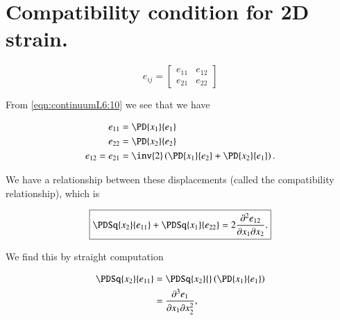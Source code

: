 % 
% 
% 
% 
% 
% 
% 
% 
% 
% 
% 
% 

\section{Compatibility condition for 2D strain.}

\begin{equation}\label{eqn:continuumL6:50}
e_{ij} = 
\begin{bmatrix}
e_{11} & e_{12} \\
e_{21} & e_{22}
\end{bmatrix}
\end{equation}

From \ref{eqn:continuumL6:10} we see that we have

\begin{align}\label{eqn:continuumL6:70}
e_{11} &= \PD{x_1}{e_1} \\
e_{22} &= \PD{x_2}{e_2} \\
e_{12} = e_{21} &= 
\inv{2} \left( 
\PD{x_1}{e_2}
+ \PD{x_2}{e_1} 
\right).
\end{align}

We have a relationship between these displacements (called the compatibility relationship), which is

\begin{equation}\label{eqn:continuumL6:110}
\boxed{
\PDSq{x_2}{e_{11}} +
\PDSq{x_1}{e_{22}} = 
2
\frac{\partial^2 e_{12}}{\partial x_1 \partial x_2}.
}
\end{equation}

We find this by straight computation

\begin{align*}
\PDSq{x_2}{e_{11}} 
&= 
\PDSq{x_2}{}\left( 
\PD{x_1}{e_1}
\right) \\
&=
\frac{\partial^3 e_1}{\partial x_1 \partial x_2^2},
\end{align*}

